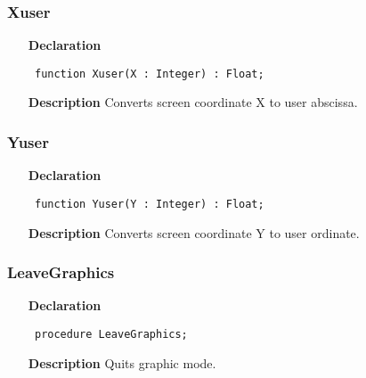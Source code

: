 \documentclass[12pt,a4paper,oneside]{report}
\newcommand{\declarationitem}[1]{\textbf{#1}}
\newcommand{\descriptiontitle}[1]{\textbf{#1}}
\newcommand{\code}[1]{\texttt{#1}}
\begin{document}
\subsubsection{Xuser}
\label{uplot-Xuser}
\begin{itemize}\item[\declarationitem{Declaration}\hfill]
	\begin{flushleft}
		\code{
			function Xuser(X : Integer) : Float;}
		
	\end{flushleft}
	
	\par
	\item[\descriptiontitle{Description}]
	Converts screen coordinate X to user abscissa.
	
\end{itemize}
\subsubsection{Yuser}
\label{uplot-Yuser}
\begin{itemize}\item[\declarationitem{Declaration}\hfill]
	\begin{flushleft}
		\code{
			function Yuser(Y : Integer) : Float;}
		
	\end{flushleft}
	
	\par
	\item[\descriptiontitle{Description}]
	Converts screen coordinate Y to user ordinate.
	
\end{itemize}
\subsubsection{LeaveGraphics}
\label{uplot-LeaveGraphics}
\begin{itemize}\item[\declarationitem{Declaration}\hfill]
	\begin{flushleft}
		\code{
			procedure LeaveGraphics;}
		
	\end{flushleft}
	
	\par
	\item[\descriptiontitle{Description}]
	Quits graphic mode.
	
\end{itemize}
\end{document}
